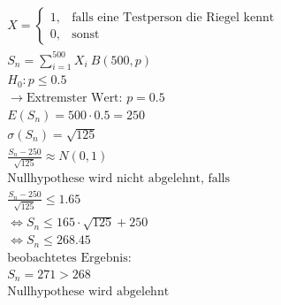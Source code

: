 \begin{align*}
    X = \begin{cases}
            1, & \text{falls eine Testperson die Riegel kennt} \\
            0, & \text{sonst}
        \end{cases} \\
    S_n = \sum_{i = 1}^{500} X_i ~ B(500, p)               \\
    H_0: p \leq 0.5                                        \\
    \rightarrow \text{Extremster Wert: } p = 0.5           \\
    E(S_n) = 500 \cdot 0.5 = 250                           \\
    \sigma(S_n) = \sqrt{125}                               \\
    \frac{S_n - 250}{\sqrt{125}} \approx N(0, 1)           \\
    \text{Nullhypothese wird nicht abgelehnt, falls}       \\
    \frac{S_n - 250}{\sqrt{125}} \leq 1.65                 \\
    \Leftrightarrow S_n \leq 165 \cdot \sqrt{125} + 250    \\
    \Leftrightarrow S_n \leq 268.45                        \\
    \text{beobachtetes Ergebnis:}                          \\
    S_n = 271 > 268                                        \\
    \text{Nullhypothese wird abgelehnt}
\end{align*}